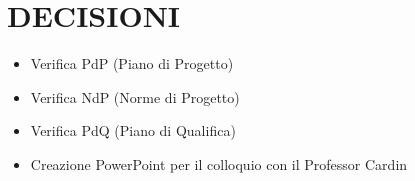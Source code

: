 \documentclass[5pt]{article}
\begin{document}
\section{DECISIONI}
\begin{itemize}
    \item Verifica PdP (Piano di Progetto)
    \item Verifica NdP (Norme di Progetto)
    \item Verifica PdQ (Piano di Qualifica)
    \item Creazione PowerPoint per il colloquio con il Professor Cardin
\end{itemize}
\end{document}

